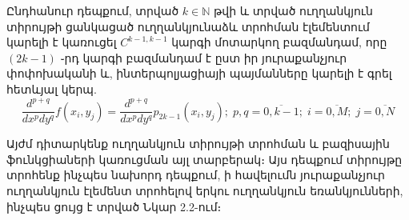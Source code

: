 \documentclass[fleqn, bachelor,subf,12pt,notitlepage]{article}
\begin{document}
Ընդհանուր դեպքում, տրված $k\in \mathbb{N}$ թվի և տրված ուղղանկյուն տիրույթի ցանկացած ուղղանկյունաձև տրոհման էլեմենտում կարելի է կառուցել $C^{k-1, k-1}$ կարգի մոտարկող բազմանդամ, որը $\left(2k-1\right)$ ֊րդ կարգի բազմանդամ է ըստ իր յուրաքանչյուր փոփոխականի և, ինտերպոլյացիայի պայմանները կարելի է գրել հետևյալ կերպ.
\begin{equation}
\dfrac{d^{p+q}}{dx^p dy^{q}}f(x_{i}, y_{j})=\dfrac{d^{p+q}}{dx^{p}dy^{q}}p_{2k-1}(x_{i}, y_{j}); \; p, q = \overline{0, k-1}; \;i=\overline{0, M};  \;  j=\overline{0, N}
\end{equation}
\newpage

\noindent Այժմ դիտարկենք ուղղանկյուն տիրույթի տրոհման և բազիսային ֆունկցիաների կառուցման այլ տարբերակ։ Այս դեպքում տիրույթը տրոհենք ինչպես նախորդ դեպքում, ի հավելումն յուրաքանչյուր ուղղանկյուն էլեմենտ տրոհելով երկու ուղղանկյուն եռանկյունների, ինչպես ցույց է տրված Նկար 2.2-ում։
\end{document}
